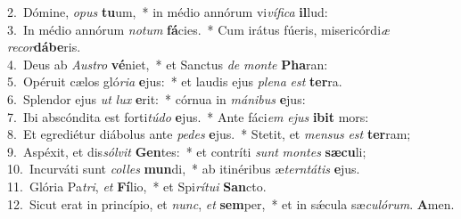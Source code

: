 {2.~}Dómine, \textit{o}\textit{pus} \textbf{tu}um,~* in médio annórum vi\textit{ví}\textit{fi}\textit{ca} \textbf{il}lud:\\
{3.~}In médio annórum \textit{no}\textit{tum} \textbf{fá}cies.~* Cum irátus fúeris, misericórdi\textit{æ} \textit{re}\textit{cor}\textbf{dá}\textbf{be}ris.\\
{4.~}Deus ab \textit{Au}\textit{stro} \textbf{vé}niet,~* et Sanctus \textit{de} \textit{mon}\textit{te} \textbf{Pha}ran:\\
{5.~}Opéruit cælos gló\textit{ri}\textit{a} \textbf{e}jus:~* et laudis ejus \textit{ple}\textit{na} \textit{est} \textbf{ter}ra.\\
{6.~}Splendor ejus \textit{ut} \textit{lux} \textbf{e}rit:~* córnua in \textit{má}\textit{ni}\textit{bus} \textbf{e}jus:\\
{7.~}Ibi abscóndita est forti\textit{tú}\textit{do} \textbf{e}jus.~* Ante fáci\textit{em} \textit{e}\textit{jus} \textbf{i}\textbf{bit} mors:\\
{8.~}Et egrediétur diábolus ante \textit{pe}\textit{des} \textbf{e}jus.~* Stetit, et \textit{men}\textit{sus} \textit{est} \textbf{ter}ram;\\
{9.~}Aspéxit, et dis\textit{sól}\textit{vit} \textbf{Gen}tes:~* et contríti \textit{sunt} \textit{mon}\textit{tes} \textbf{sæ}\textbf{cu}li;\\
{10.~}Incurváti sunt \textit{col}\textit{les} \textbf{mun}di,~* ab itinéribus æ\textit{ter}\textit{ntá}\textit{tis} \textbf{e}jus.\\
{11.~}Glória Pa\textit{tri}, \textit{et} \textbf{Fí}lio,~* et Spi\textit{rí}\textit{tu}\textit{i} \textbf{San}cto.\\
{12.~}Sicut erat in princípio, et \textit{nunc}, \textit{et} \textbf{sem}per,~* et in sǽcula sæ\textit{cu}\textit{ló}\textit{rum}. \textbf{A}men.\\

